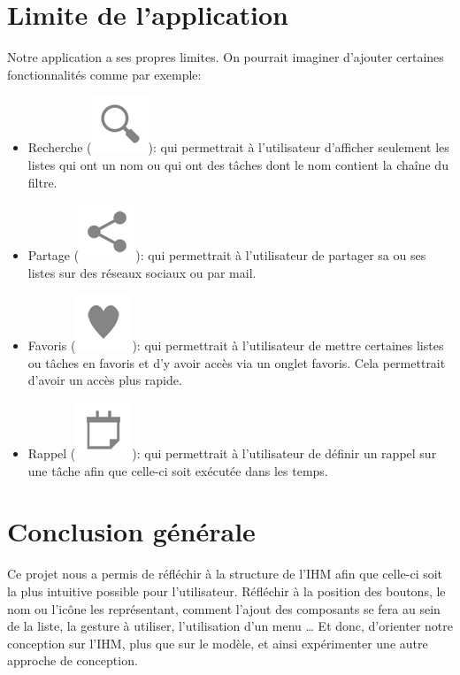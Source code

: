 \documentclass[a4paper,10pt]{article}
\begin{document}
\section{Limite de l'application}
Notre application a ses propres limites.
On pourrait imaginer d'ajouter certaines fonctionnalités comme par exemple:
\begin{itemize}
\item Recherche (\includegraphics[scale=0.2]{Images/search.png}): qui permettrait à l'utilisateur d'afficher seulement les listes qui ont un nom ou qui ont des tâches dont le nom contient la chaîne du filtre.
\item Partage (\includegraphics[scale=0.2]{Images/share.png}): qui permettrait à l'utilisateur de partager sa ou ses listes sur des réseaux sociaux ou par mail.
\item Favoris (\includegraphics[scale=0.2]{Images/favorite.png}): qui permettrait à l'utilisateur de mettre certaines listes ou tâches en favoris et d'y avoir accès via un onglet favoris. Cela permettrait d'avoir un accès plus rapide.
\item Rappel (\includegraphics[scale=0.2]{Images/event.png}): qui permettrait à l'utilisateur de définir un rappel sur une tâche afin que celle-ci soit exécutée dans les temps.
\end{itemize}

\newpage
\section{Conclusion générale}
Ce projet nous a permis de réfléchir à la structure de l'IHM afin que celle-ci soit la plus intuitive possible pour l'utilisateur. Réfléchir à la position des
boutons, le nom ou l'icône les représentant, comment l'ajout des composants se fera au sein de la liste, la gesture à utiliser, l'utilisation d'un menu \ldots{}
Et donc, d'orienter notre conception sur l'IHM, plus que sur le modèle, et ainsi expérimenter une autre approche de conception.
\end{document}
